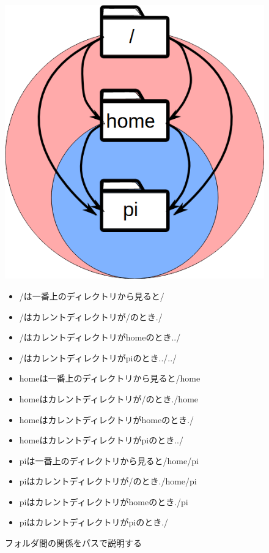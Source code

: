 \begin{figure}[H]
    \begin{minipage}{0.4\hsize}
        \includegraphics[width=\hsize]{images/chap03/text03-img004.png}
    \end{minipage}
    \begin{minipage}{0.6\hsize}
        \begin{itemize}
        \item /は一番上のディレクトリから見ると/
        \item /はカレントディレクトリが/のとき./
        \item /はカレントディレクトリがhomeのとき../
        \item /はカレントディレクトリがpiのとき../../
        \item homeは一番上のディレクトリから見ると/home
        \item homeはカレントディレクトリが/のとき./home
        \item homeはカレントディレクトリがhomeのとき./
        \item homeはカレントディレクトリがpiのとき../
        \item piは一番上のディレクトリから見ると/home/pi
        \item piはカレントディレクトリが/のとき./home/pi
        \item piはカレントディレクトリがhomeのとき./pi
        \item piはカレントディレクトリがpiのとき./
        \end{itemize}
    \end{minipage}
    \caption{フォルダ間の関係をパスで説明する}
    \label{fig:folder-path}
\end{figure}

